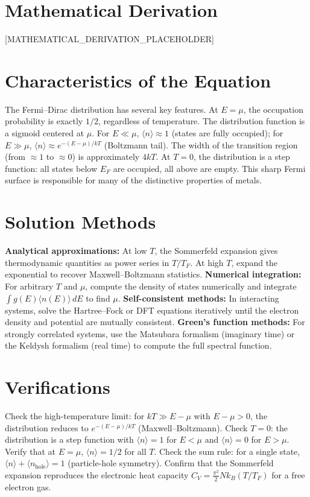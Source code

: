 \documentclass[11pt,openright]{book}
\begin{document}
\section*{Mathematical Derivation}

[MATHEMATICAL_DERIVATION_PLACEHOLDER]

\section*{Characteristics of the Equation}

The Fermi--Dirac distribution has several key features. At $E = \mu$, the occupation probability is exactly $1/2$, regardless of temperature. The distribution function is a sigmoid centered at $\mu$. For $E \ll \mu$, $\langle n \rangle \approx 1$ (states are fully occupied); for $E \gg \mu$, $\langle n \rangle \approx e^{-(E-\mu)/kT}$ (Boltzmann tail). The width of the transition region (from $\approx 1$ to $\approx 0$) is approximately $4kT$. At $T = 0$, the distribution is a step function: all states below $E_F$ are occupied, all above are empty. This sharp Fermi surface is responsible for many of the distinctive properties of metals.
\section*{Solution Methods}

\textbf{Analytical approximations:} At low $T$, the Sommerfeld expansion gives thermodynamic quantities as power series in $T/T_F$. At high $T$, expand the exponential to recover Maxwell--Boltzmann statistics. \textbf{Numerical integration:} For arbitrary $T$ and $\mu$, compute the density of states numerically and integrate $\int g(E)\langle n(E)\rangle\,dE$ to find $\mu$. \textbf{Self-consistent methods:} In interacting systems, solve the Hartree--Fock or DFT equations iteratively until the electron density and potential are mutually consistent. \textbf{Green's function methods:} For strongly correlated systems, use the Matsubara formalism (imaginary time) or the Keldysh formalism (real time) to compute the full spectral function.
\section*{Verifications}

Check the high-temperature limit: for $kT \gg E - \mu$ with $E - \mu > 0$, the distribution reduces to $e^{-(E-\mu)/kT}$ (Maxwell--Boltzmann). Check $T = 0$: the distribution is a step function with $\langle n \rangle = 1$ for $E < \mu$ and $\langle n \rangle = 0$ for $E > \mu$. Verify that at $E = \mu$, $\langle n \rangle = 1/2$ for all $T$. Check the sum rule: for a single state, $\langle n \rangle + \langle n_{\text{hole}} \rangle = 1$ (particle-hole symmetry). Confirm that the Sommerfeld expansion reproduces the electronic heat capacity $C_V = \frac{\pi^2}{2}Nk_B(T/T_F)$ for a free electron gas.
\end{document}
